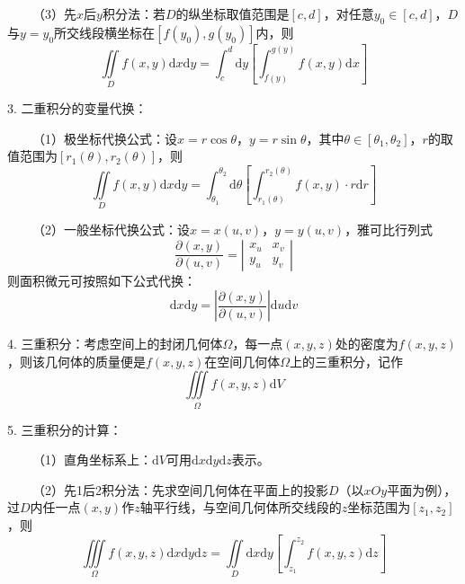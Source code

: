 ~~~~（3）先$x$后$y$积分法：若$D$的纵坐标取值范围是$[c,d]$，对任意$y_0\in [c,d]$，$D$与$y=y_0$所交线段横坐标在$[f(y_0),g(y_0)]$内，则
\begin{equation*}
    \iint\limits_{D}f(x,y)\mathrm{d}x\mathrm{d}y=\int_c^d\mathrm{d}y\left[\int_{f(y)}^{g(y)}f(x,y)\mathrm{d} x\right]
\end{equation*}

3. 二重积分的变量代换：

~~~~（1）极坐标代换公式：设$x=r\cos\theta$，$y=r\sin\theta$，其中$\theta\in [\theta_1,\theta_2]$，$r$的取值范围为$[r_1(\theta),r_2(\theta)]$，则
\begin{equation*}
    \iint\limits_D f(x,y)\mathrm{d}x\mathrm{d}y=\int_{\theta_1}^{\theta_2} \mathrm{d}\theta \left[\int_{r_1(\theta)}^{r_2(\theta)}f(x,y)\cdot r\mathrm{d}r\right]
\end{equation*}

~~~~（2）一般坐标代换公式：设$x=x(u,v)$，$y=y(u,v)$，雅可比行列式
\begin{equation*}
    \frac{\partial(x,y)}{\partial(u,v)}=\left|\begin{matrix}
        x_u&x_v\\
        y_u&y_v
    \end{matrix}\right|
\end{equation*}
则面积微元可按照如下公式代换：
\begin{equation*}
    \mathrm{d}x\mathrm{d}y=\left|\frac{\partial(x,y)}{\partial(u,v)}\right|\mathrm{d}u\mathrm{d}v
\end{equation*}

4. 三重积分：考虑空间上的封闭几何体$\Omega$，每一点$(x,y,z)$处的密度为$f(x,y,z)$，则该几何体的质量便是$f(x,y,z)$在空间几何体$\Omega$上的三重积分，记作
\begin{equation*}
    \iiint\limits_\Omega f(x,y,z)\mathrm{d}V
\end{equation*}

5. 三重积分的计算：

~~~~（1）直角坐标系上：$\mathrm{d}V$可用$\mathrm{d}x\mathrm{d}y\mathrm{d}z$表示。

~~~~（2）先1后2积分法：先求空间几何体在平面上的投影$D$（以$xOy$平面为例），过$D$内任一点$(x,y)$作$z$轴平行线，与空间几何体所交线段的$z$坐标范围为$[z_1,z_2]$，则
\begin{equation*}
    \iiint\limits_\Omega f(x,y,z)\mathrm{d}x \mathrm{d}y\mathrm{d}z = \iint\limits_D \mathrm{d}x\mathrm{d}y\left[\int_{z_1}^{z_2} f(x,y,z)\mathrm{d}z\right]
\end{equation*}

